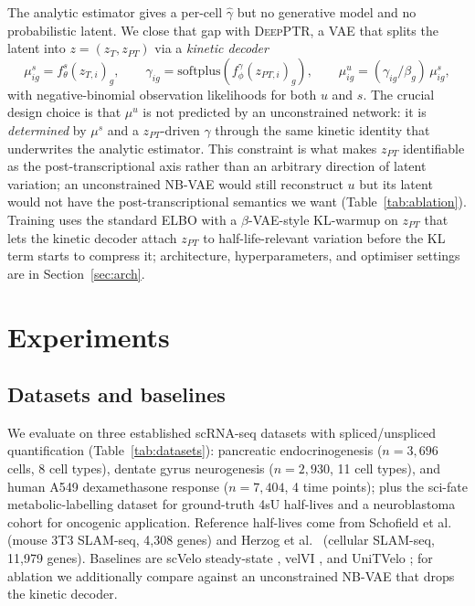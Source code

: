 \documentclass{article}
\begin{document}
The analytic estimator gives a per-cell $\widehat{\gamma}$ but no generative model and no probabilistic latent. We close that gap with \textsc{DeepPTR}, a VAE that splits the latent into $z{=}(z_T, z_{PT})$ via a \textit{kinetic decoder}
\begin{equation}
  \mu^s_{ig} = f^s_\theta(z_{T,i})_g, \qquad \gamma_{ig} = \mathrm{softplus}\!\left(f^\gamma_\phi(z_{PT,i})_g\right), \qquad \mu^u_{ig} = (\gamma_{ig}/\beta_g)\,\mu^s_{ig},
  \label{eq:deepptr}
\end{equation}
with negative-binomial observation likelihoods for both $u$ and $s$. The crucial design choice is that $\mu^u$ is not predicted by an unconstrained network: it is \textit{determined} by $\mu^s$ and a $z_{PT}$-driven $\gamma$ through the same kinetic identity that underwrites the analytic estimator. This constraint is what makes $z_{PT}$ identifiable as the post-transcriptional axis rather than an arbitrary direction of latent variation; an unconstrained NB-VAE would still reconstruct $u$ but its latent would not have the post-transcriptional semantics we want (Table~\ref{tab:ablation}). Training uses the standard ELBO with a $\beta$-VAE-style KL-warmup on $z_{PT}$ that lets the kinetic decoder attach $z_{PT}$ to half-life-relevant variation before the KL term starts to compress it; architecture, hyperparameters, and optimiser settings are in Section~\ref{sec:arch}.

\section{Experiments}
\label{sec:experiments}

\subsection{Datasets and baselines}
\label{sec:datasets}

We evaluate on three established scRNA-seq datasets with spliced/unspliced quantification (Table~\ref{tab:datasets}): pancreatic endocrinogenesis ($n{=}3{,}696$ cells, 8 cell types), dentate gyrus neurogenesis ($n{=}2{,}930$, 11 cell types), and human A549 dexamethasone response ($n{=}7{,}404$, 4 time points); plus the sci-fate metabolic-labelling dataset \cite{cao2020} for ground-truth 4sU half-lives and a neuroblastoma cohort \cite{dong2020} for oncogenic application. Reference half-lives come from Schofield et al.\ \cite{schofield2018} (mouse 3T3 SLAM-seq, 4,308 genes) and Herzog et al.\ \cite{herzog2017} (cellular SLAM-seq, 11,979 genes). Baselines are scVelo steady-state \cite{bergen2020}, velVI \cite{gayoso2024}, and UniTVelo \cite{gao2022}; for ablation we additionally compare against an unconstrained NB-VAE that drops the kinetic decoder.
\end{document}
